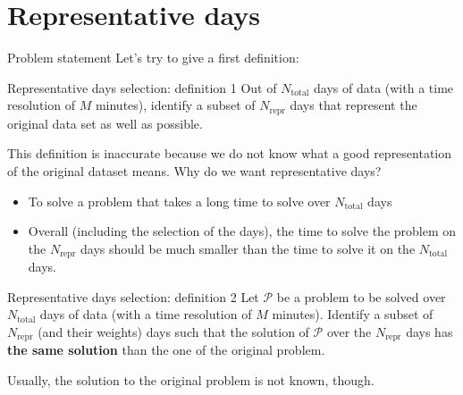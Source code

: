 \section{Representative days}
\begin{frame}[allowframebreaks]{Problem statement}
Let's try to give a first definition: 
\begin{block}{Representative days selection: definition 1}
Out of $N_{\text{total}}$ days of data (with a time resolution of $M$ minutes), identify a subset of $N_{\text{repr}}$ days that represent the original data set as well as possible.
\end{block}

This definition is inaccurate because we do not know what a good representation of the original dataset means. Why do we want representative days? 

\begin{itemize}
    \item To solve a problem that takes a long time to solve over $N_{\text{total}}$ days
    \item Overall (including the selection of the days), the time to solve the problem on the $N_{\text{repr}}$ days should be much smaller than the time to solve it on the $N_{\text{total}}$ days.
\end{itemize}

\begin{block}{Representative days selection: definition 2}
Let $\mathcal{P}$ be a problem to be solved over $N_{\text{total}}$ days of data (with a time resolution of $M$ minutes). Identify a subset of $N_{\text{repr}}$ (and their weights)  days such that the solution of $\mathcal{P}$ over the $N_{\text{repr}}$ days has \textbf{the same solution} than the one of the original problem.
\end{block}

Usually, the solution to the original problem is not known, though.
\end{frame}

